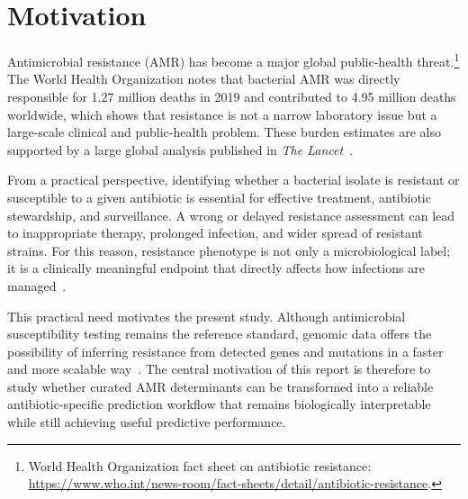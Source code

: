 \section{Motivation}

Antimicrobial resistance (AMR) has become a major global public-health threat.\footnote{World Health Organization fact sheet on antibiotic resistance: \url{https://www.who.int/news-room/fact-sheets/detail/antibiotic-resistance}.} The World Health Organization notes that bacterial AMR was directly responsible for 1.27 million deaths in 2019 and contributed to 4.95 million deaths worldwide, which shows that resistance is not a narrow laboratory issue but a large-scale clinical and public-health problem. These burden estimates are also supported by a large global analysis published in \textit{The Lancet}~\citep{amrcollaborators2022global}.

From a practical perspective, identifying whether a bacterial isolate is resistant or susceptible to a given antibiotic is essential for effective treatment, antibiotic stewardship, and surveillance. A wrong or delayed resistance assessment can lead to inappropriate therapy, prolonged infection, and wider spread of resistant strains. For this reason, resistance phenotype is not only a microbiological label; it is a clinically meaningful endpoint that directly affects how infections are managed~\citep{shen2024comparison}.

This practical need motivates the present study. Although antimicrobial susceptibility testing remains the reference standard, genomic data offers the possibility of inferring resistance from detected genes and mutations in a faster and more scalable way~\citep{feldgarden2021amrfinderplus,ren2022prediction}. The central motivation of this report is therefore to study whether curated AMR determinants can be transformed into a reliable antibiotic-specific prediction workflow that remains biologically interpretable while still achieving useful predictive performance.
